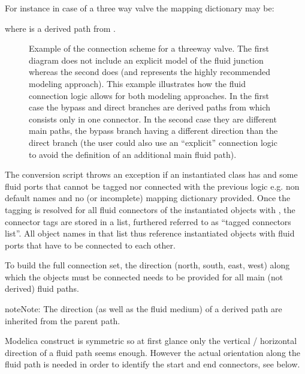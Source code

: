 \documentclass[letterpaper,10pt, openany,english]{sphinxmanual}
\begin{document}
\begin{enumerate}
\begin{itemize}
For instance in case of a three way valve the mapping dictionary may be:

 where  is a derived path from .

\end{itemize}

\end{enumerate}

\begin{figure}[htbp]
\centering
\capstart

\noindent{}
\caption{Example of the connection scheme for a three\sphinxhyphen{}way valve. The first diagram does not include an explicit model of the fluid junction whereas the second does (and represents the highly recommended modeling approach). This example illustrates how the fluid connection logic allows for both modeling approaches. In the first case the bypass and direct branches are derived paths from  which consists only in one connector. In the second case they are different main paths, the bypass branch having a different direction than the direct branch (the user could also use an “explicit” connection logic to avoid the definition of an additional main fluid path).}\label{\detokenize{requirements:linkage-connect-3wv}}\end{figure}

The conversion script throws an exception if an instantiated class has  and some fluid ports that cannot be tagged nor connected with the previous logic e.g. non default names and no (or incomplete) mapping dictionary provided.
Once the tagging is resolved for all fluid connectors of the instantiated objects with , the connector tags are stored in a list, furthered referred to as “tagged connectors list”.
All object names in that list thus reference instantiated objects with fluid ports that have to be connected to each other.

To build the full connection set, the direction (north, south, east, west) along which the objects must be connected needs to be provided for all main (not derived) fluid paths.

\begin{sphinxadmonition}{note}{Note:}
The direction (as well as the fluid medium) of a derived path are inherited from the parent path.

Modelica  construct is symmetric so at first glance only the vertical / horizontal direction of a fluid path seems enough. However the actual orientation along the fluid path is needed in order to identify the start and end connectors, see below.
\end{sphinxadmonition}
\end{document}

